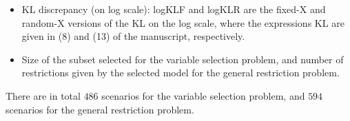 \documentclass{article}
\begin{document}
\begin{itemize}
\begin{equation*}
  \end{equation*}
  \fi
  \item KL discrepancy (on log scale): logKLF and logKLR are the fixed-X and random-X versions of the KL on the log scale, where the expressions KL are given in (8) and (13) of the manuscript, respectively.
  \iffalse
  \begin{equation*}
  \begin{aligned}
    \text{KLF} &= \text{KLF}(\hat\beta)  \\
    \text{KLR} &= \text{KLR}(\hat\beta) 
  \end{aligned}
  \end{equation*}
  \fi
  \item Size of the subset selected for the variable selection problem, and number of restrictions given by the selected model for the general restriction problem.
\end{itemize}
There are in total $486$ scenarios for the variable selection problem, and $594$ scenarios for the general restriction problem. 

\clearpage
\end{document}
